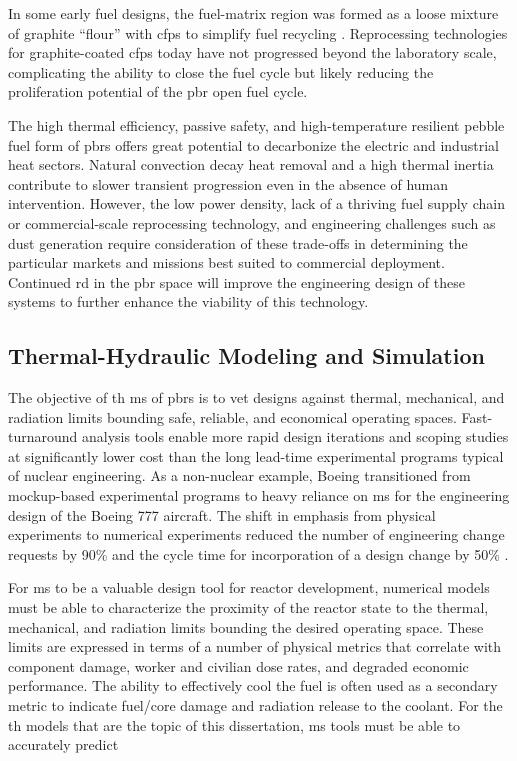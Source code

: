 In some early fuel designs, the fuel-matrix region was formed as a loose mixture of graphite ``flour'' with \glspl{cfp} to simplify fuel recycling \cite{claxton, hecker}. Reprocessing technologies for graphite-coated \glspl{cfp} today have not progressed beyond the laboratory scale, complicating the ability to close the fuel cycle \cite{moses} but likely reducing the proliferation potential of the \gls{pbr} open fuel cycle.

The high thermal efficiency, passive safety, and high-temperature resilient pebble fuel form of \glspl{pbr} offers great potential to decarbonize the electric and industrial heat sectors. Natural convection decay heat removal and a high thermal inertia contribute to slower transient progression even in the absence of human intervention. However, the low power density, lack of a thriving fuel supply chain or commercial-scale reprocessing technology, and engineering challenges such as dust generation require consideration of these trade-offs in determining the particular markets and missions best suited to commercial deployment. Continued \gls{rd} in the \gls{pbr} space will improve the engineering design of these systems to further enhance the viability of this technology.


\subsection{Thermal-Hydraulic Modeling and Simulation}
\label{sec:ph_motivation}

The objective of \gls{th} \gls{ms} of \glspl{pbr} is to vet designs against thermal, mechanical, and radiation limits bounding safe, reliable, and economical operating spaces. Fast-turnaround analysis tools enable more rapid design iterations and scoping studies at significantly lower cost than the long lead-time experimental programs typical of nuclear engineering. As a non-nuclear example, Boeing transitioned from mockup-based experimental programs to heavy reliance on \gls{ms} for the engineering design of the Boeing 777 aircraft. The shift in emphasis from physical experiments to numerical experiments reduced the number of engineering change requests by 90\% and the cycle time for incorporation of a design change by 50\% \cite{boeing}. %

For \gls{ms} to be a valuable design tool for reactor development, numerical models must be able to characterize the proximity of the reactor state to the thermal, mechanical, and radiation limits bounding the desired operating space. These limits are expressed in terms of a number of physical metrics that correlate with component damage, worker and civilian dose rates, and degraded economic performance. The ability to effectively cool the fuel is often used as a secondary metric to indicate fuel/core damage and radiation release to the coolant. For the \gls{th} models that are the topic of this dissertation, \gls{ms} tools must be able to accurately predict

